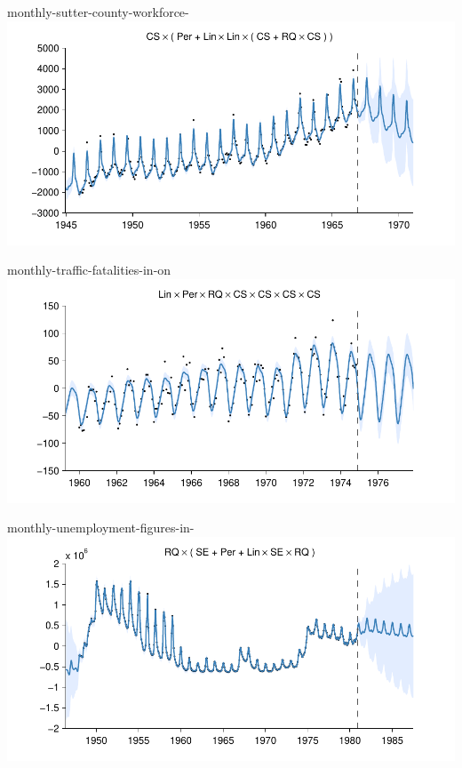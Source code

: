     
\begin{frame}{monthly-sutter-county-workforce-}
  \center
  \includegraphics[width=1.0\textwidth]{figures/monthly-sutter-county-workforce-/monthly-sutter-county-workforce-_all}
\end{frame}  


    
\begin{frame}{monthly-traffic-fatalities-in-on}
  \center
  \includegraphics[width=1.0\textwidth]{figures/monthly-traffic-fatalities-in-on/monthly-traffic-fatalities-in-on_all}
\end{frame}  


    
\begin{frame}{monthly-unemployment-figures-in-}
  \center
  \includegraphics[width=1.0\textwidth]{figures/monthly-unemployment-figures-in-/monthly-unemployment-figures-in-_all}
\end{frame}  


